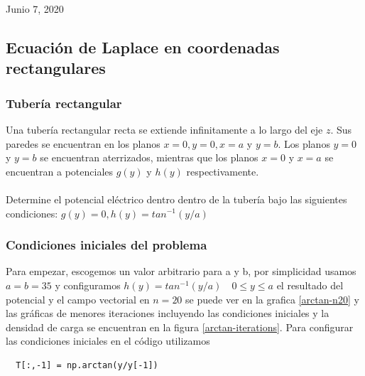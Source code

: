 \documentclass[10pt,journal,compsoc]{IEEEtran}
\begin{document}
\hfill Junio 7, 2020

\subsection{Ecuación de Laplace en coordenadas rectangulares}

\subsubsection{Tubería rectangular}
Una tubería rectangular recta se extiende infinitamente a lo largo del eje \(z\).
Sus paredes se encuentran en los planos \(x=0,y=0,x=a\) y \(y=b\).
Los planos \(y = 0\) y \(y = b\) se encuentran aterrizados, mientras que los planos
\(x = 0\) y \(x = a\) se encuentran a potenciales \(g(y)\) y \(h(y)\) respectivamente.
\\\\
Determine el potencial eléctrico dentro dentro de la tubería bajo las siguientes condiciones:
\(g(y) = 0, h(y) = tan^{-1}(y/a)\)
\\

\subsubsection{Condiciones iniciales del problema}

Para empezar, escogemos un valor arbitrario para a y b, por simplicidad usamos \(a = b = 35 \)
y configuramos \(h(y) = tan^{-1}(y/a) \quad 0\leq y \leq a \)
el resultado del potencial y el campo vectorial en \(n = 20\) se puede ver en la grafica \ref{arctan-n20}
y las gráficas de menores iteraciones incluyendo las condiciones iniciales y la densidad de carga
se encuentran en la figura \ref{arctan-iterations}.
Para configurar las condiciones iniciales en el código utilizamos
\begin{lstlisting}
  T[:,-1] = np.arctan(y/y[-1])
\end{lstlisting}
\end{document}
